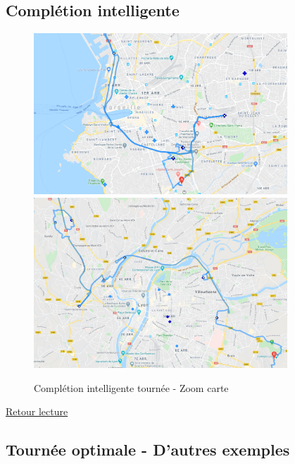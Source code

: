 \documentclass[12pt]{article}
\begin{document}
\subsection{Complétion intelligente}
\hypertarget{Ref5}{ }
\begin{figure}[H]
\caption{Complétion intelligente tournée - Zoom carte}
\begin{center}
\includegraphics[width=0.85\textwidth]{completion marseille}
\medbreak
\includegraphics[width=0.85\textwidth]{completion lyon}
\end{center}
\end{figure}
\hyperlink{Ref6}{Retour lecture}

\label{Ref1}
\newpage
\subsection{Tournée optimale - D'autres exemples}
\hypertarget{Ref7}{}
\end{document}
